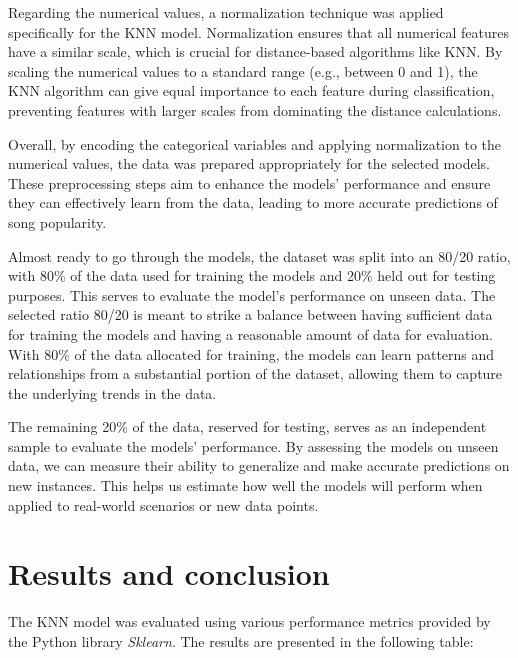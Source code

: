 \documentclass[11pt]{article} %
\begin{document}
Regarding the numerical values, a normalization technique was applied specifically for the KNN model. Normalization ensures that all numerical features have a similar scale, which is crucial for distance-based algorithms like KNN. By scaling the numerical values to a standard range (e.g., between 0 and 1), the KNN algorithm can give equal importance to each feature during classification, preventing features with larger scales from dominating the distance calculations.

Overall, by encoding the categorical variables and applying normalization to the numerical values, the data was prepared appropriately for the selected models. These preprocessing steps aim to enhance the models' performance and ensure they can effectively learn from the data, leading to more accurate predictions of song popularity.

Almost ready to go through the models, the dataset was split into an 80/20 ratio, with 80\% of the data used for training the models and 20\% held out for testing purposes. This serves to evaluate the model's performance on unseen data. The selected ratio 80/20 is meant to strike a balance between having sufficient data for training the models and having a reasonable amount of data for evaluation. With 80\% of the data allocated for training, the models can learn patterns and relationships from a substantial portion of the dataset, allowing them to capture the underlying trends in the data.

The remaining 20\% of the data, reserved for testing, serves as an independent sample to evaluate the models' performance. By assessing the models on unseen data, we can measure their ability to generalize and make accurate predictions on new instances. This helps us estimate how well the models will perform when applied to real-world scenarios or new data points.

\section{Results and conclusion}

The KNN model was evaluated using various performance metrics provided by the Python library \textit{Sklearn}. The results are presented in the following table:
\end{document}
